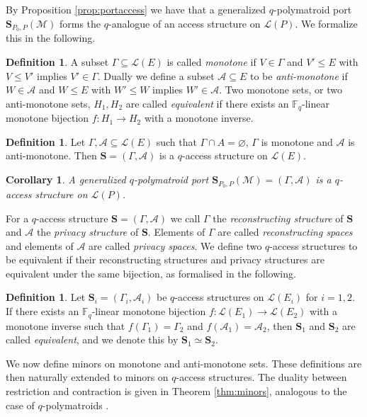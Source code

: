 \documentclass[onecolumn,draftclsnofoot,12pt]{IEEEtran}
\newcommand{\F}{\mathbb{F}}
\renewcommand{\L}{\mathcal{L}}
\newcommand{\A}{\mathcal{A}}
\renewcommand{\S}{\mathbf{S}}
\newcommand{\M}{\mathcal{M}}
\theoremstyle{plain} %
\newtheorem{corollary}[theorem]{Corollary}
\theoremstyle{definition}
\newtheorem{definition}[theorem]{Definition}
\begin{document}
By Proposition \ref{prop:portaccess} we have that a generalized $q$-polymatroid port $\mathbf{S}_{P_0,P}(\M)$ forms the $q$-analogue of an access structure on $\L(P)$. We formalize this in the following.

\begin{definition}
    A subset $\Gamma\subseteq \L(E)$ is called \emph{monotone} if $V\in \Gamma$ and $V'\leq E$ with $V\leq V'$ implies $V'\in \Gamma$. Dually we define a subset $\A\subseteq E$ to be \emph{anti-monotone} if $W\in \A$ and $W\leq E$ with $W'\leq W$ implies $W'\in \A$. Two monotone sets, or two anti-monotone sets, $H_1,H_2$ are called \emph{equivalent} if there exists an $\F_q$-linear monotone bijection $f\colon H_1\rightarrow H_2$ with a monotone inverse.
\end{definition}

\begin{definition}
    Let $\Gamma,\A\subseteq \L(E)$ such that $\Gamma \cap A=\varnothing$, $\Gamma$ is monotone and $\A$ is anti-monotone. Then $\mathbf{S} =(\Gamma,\A)$ is a $q$-access structure on $\L(E)$.
\end{definition}

\begin{corollary}
A generalized $q$-polymatroid port $\S_{P_0,P}(\M)=(\Gamma,\A)$ is a $q$-access structure on $\L(P)$.
\end{corollary}


For a $q$-access structure $\S=(\Gamma,\A)$ we call $\Gamma$ the \emph{reconstructing structure} of $\S$ and $\A$ the \emph{privacy structure} of $\S$. Elements of $\Gamma$ are called \emph{reconstructing spaces} and elements of $\A$ are called \emph{privacy spaces}. We define two $q$-access structures to be equivalent if their reconstructing structures and privacy structures are equivalent under the same bijection, as formalised in the following.

\begin{definition} Let $\mathbf{S}_i = (\Gamma_i,\A_i)$ be $q$-access structures on $\L(E_i)$ for $i=1,2$. If there exists an $\F_q$-linear monotone bijection $f\colon \L(E_1) \rightarrow \L(E_2)$ with a monotone inverse such that $f(\Gamma_1) = \Gamma_2$ and $f(\A_1) =\A_2$, then $\mathbf{S}_1$ and $\mathbf{S}_2$ are called \textit{equivalent}, and we denote this by $\S_1 \simeq \S_2$.
\end{definition}


We now define minors on monotone and anti-monotone sets. These definitions are then naturally extended to minors on $q$-access structures. The duality between restriction and contraction is given in Theorem \ref{thm:minors}, analogous to the case of $q$-polymatroids \cite{BYRNE2024105799,DBLP:journals/corr/abs-2104-06570}.
\end{document}
